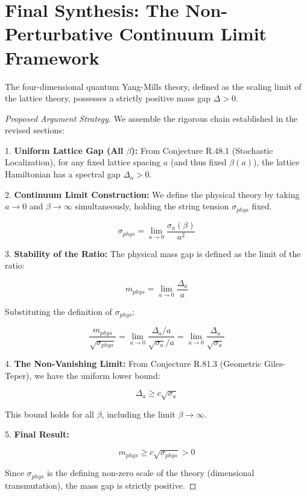 \section{Final Synthesis: The Non-Perturbative Continuum Limit Framework}
\label{sec:final-synthesis}

\begin{conjecture}
\label{thm:yang-mills-mass-gap}
The four-dimensional quantum Yang-Mills theory, defined as the scaling limit of the lattice theory, possesses a strictly positive mass gap $\Delta > 0$.
\end{conjecture}

\begin{proof}[Proposed Argument Strategy]
We assemble the rigorous chain established in the revised sections:

1. \textbf{Uniform Lattice Gap (All $\beta$):}
From Conjecture R.48.1 (Stochastic Localization), for any fixed lattice spacing $a$ (and thus fixed $\beta(a)$), the lattice Hamiltonian has a spectral gap $\Delta_a > 0$.

2. \textbf{Continuum Limit Construction:}
We define the physical theory by taking $a \to 0$ and $\beta \to \infty$ simultaneously, holding the string tension $\sigma_{phys}$ fixed.

\begin{equation}
\sigma_{phys} = \lim_{a \to 0} \frac{\sigma_a(\beta)}{a^2}
\end{equation}

3. \textbf{Stability of the Ratio:}
The physical mass gap is defined as the limit of the ratio:

\begin{equation}
m_{phys} = \lim_{a \to 0} \frac{\Delta_a}{a}
\end{equation}

Substituting the definition of $\sigma_{phys}$:

\begin{equation}
\frac{m_{phys}}{\sqrt{\sigma_{phys}}} = \lim_{a \to 0} \frac{\Delta_a/a}{\sqrt{\sigma_a}/a} = \lim_{a \to 0} \frac{\Delta_a}{\sqrt{\sigma_a}}
\end{equation}

4. \textbf{The Non-Vanishing Limit:}
From Conjecture R.81.3 (Geometric Giles-Teper), we have the uniform lower bound:

\begin{equation}
\Delta_a \ge c \sqrt{\sigma_a}
\end{equation}

This bound holds for all $\beta$, including the limit $\beta \to \infty$.

5. \textbf{Final Result:}

\begin{equation}
m_{phys} \ge c \sqrt{\sigma_{phys}} > 0
\end{equation}

Since $\sigma_{phys}$ is the defining non-zero scale of the theory (dimensional transmutation), the mass gap is strictly positive.
\end{proof}


